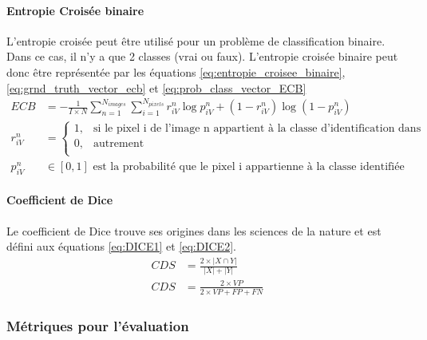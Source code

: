       \paragraph{Entropie Croisée binaire} L'entropie croisée peut être utilisé pour un problème de classification binaire. Dans ce cas, il n'y a que 2 classes (vrai ou faux). L'entropie croisée binaire peut donc être représentée par les équations \ref{eq:entropie_croisee_binaire}, \ref{eq:grnd_truth_vector_ecb} et \ref{eq:prob_class_vector_ECB}
      \begin{align}
        ECB & = -\frac{1}{I \times N} \sum_{n=1}^{N_{images}}\sum_{i=1}^{N_{pixels}}r^{n}_{iV} \log{p^{n}_{iV}} +
        (1-r^{n}_{iV}) \log{(1-p^{n}_{iV})} \label{eq:entropie_croisee_binaire}\\
        r^{n}_{iV} & = \begin{cases}
          1,& \mbox{si le pixel i de l'image n appartient à la classe d'identification dans l'annotation d'entrainement}\\
          0,& \mbox{autrement}\\ \end{cases}\label{eq:grnd_truth_vector_ecb}\\
        p^{n}_{iV} & \in [0,1]\mbox{ est la probabilité que le pixel i appartienne à la classe identifiée}\label{eq:prob_class_vector_ECB}
      \end{align}
      \paragraph{Coefficient de Dice} 
      Le coefficient de Dice trouve ses origines dans les sciences de la nature \parencite{dice_measures_1945} et est défini aux équations \ref{eq:DICE1} et \ref{eq:DICE2}.
      \begin{align} 
        CDS & = \frac{2 \times \lvert X \cap Y \rvert}{\lvert X \rvert + \lvert Y \rvert}\label{eq:DICE1} \\
        CDS & = \frac{2 \times VP}{2 \times VP + FP + FN}\label{eq:DICE2}
      \end{align}
    \subsubsection{Métriques pour l'évaluation}
